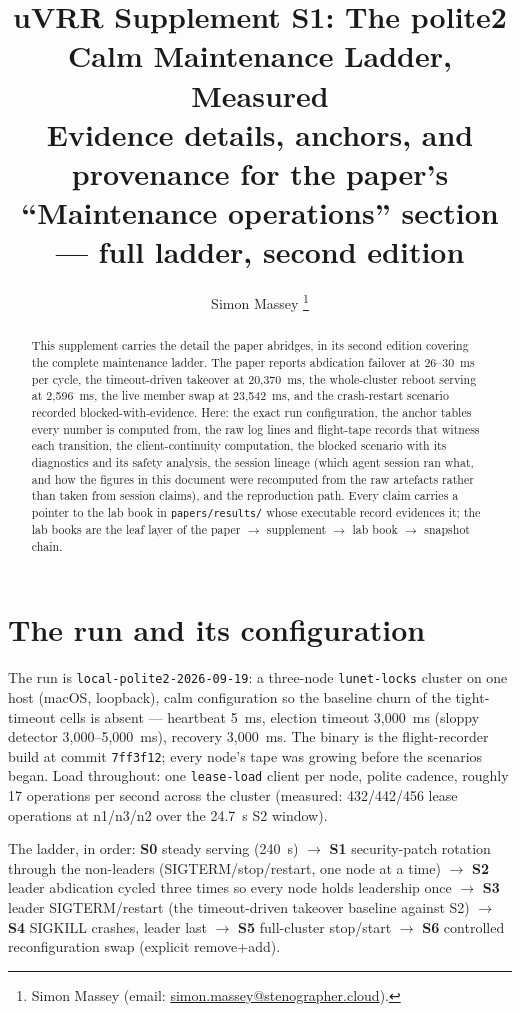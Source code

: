 \documentclass[10pt,journal,letterpaper]{IEEEtran}
\title{uVRR Supplement S1: The polite2 Calm Maintenance Ladder, Measured\\
{\large Evidence details, anchors, and provenance for the paper's
``Maintenance operations'' section --- full ladder, second edition}}
\author{Simon Massey%
\thanks{Simon Massey (email: \href{mailto:simon.massey@stenographer.cloud}{simon.massey@stenographer.cloud}).}}
\date{}
\newcommand{\code}[1]{\texttt{\small #1}}
\begin{document}
\maketitle
\thispagestyle{uvrrfirst}

\begin{abstract}
This supplement carries the detail the paper abridges, in its second
edition covering the complete maintenance ladder. The paper reports
abdication failover at 26--30~ms per cycle, the timeout-driven takeover
at 20{,}370~ms, the whole-cluster reboot serving at 2{,}596~ms, the
live member swap at 23{,}542~ms, and the crash-restart scenario
recorded blocked-with-evidence. Here: the exact run configuration, the
anchor tables every number is computed from, the raw log lines and
flight-tape records that witness each transition, the
client-continuity computation, the blocked scenario with its
diagnostics and its safety analysis, the session lineage (which agent
session ran what, and how the figures in this document were recomputed
from the raw artefacts rather than taken from session claims), and the
reproduction path. Every claim carries a pointer to the lab book in
\code{papers/results/} whose executable record evidences it; the lab
books are the leaf layer of the paper $\to$ supplement $\to$ lab book
$\to$ snapshot chain.
\end{abstract}

\section{The run and its configuration}
\label{sec:config}

The run is \code{local-polite2-2026-09-19}: a three-node
\code{lunet-locks} cluster on one host (macOS, loopback), calm
configuration so the baseline churn of the tight-timeout cells is
absent --- heartbeat 5~ms, election timeout 3{,}000~ms (sloppy detector
3{,}000--5{,}000~ms), recovery 3{,}000~ms. The binary is the
flight-recorder build at commit \code{7ff3f12}; every node's tape was
growing before the scenarios began. Load throughout: one
\code{lease-load} client per node, polite cadence, roughly 17
operations per second across the cluster (measured: 432/442/456 lease
operations at n1/n3/n2 over the 24.7~s S2 window).

The ladder, in order: \textbf{S0} steady serving (240~s) $\to$
\textbf{S1} security-patch rotation through the non-leaders
(SIGTERM/stop/restart, one node at a time) $\to$ \textbf{S2} leader
abdication cycled three times so every node holds leadership once
$\to$ \textbf{S3} leader SIGTERM/restart (the timeout-driven takeover
baseline against S2) $\to$ \textbf{S4} SIGKILL crashes, leader last
$\to$ \textbf{S5} full-cluster stop/start $\to$ \textbf{S6} controlled
reconfiguration swap (explicit remove+add).
\end{document}
